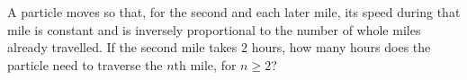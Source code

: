 A particle moves so that, for the second and each later mile, its speed during that mile is constant and is inversely proportional to the number of whole miles already travelled. If the second mile takes $2$ hours, how many hours does the particle need to traverse the $n$th mile, for $n\ge2$?
